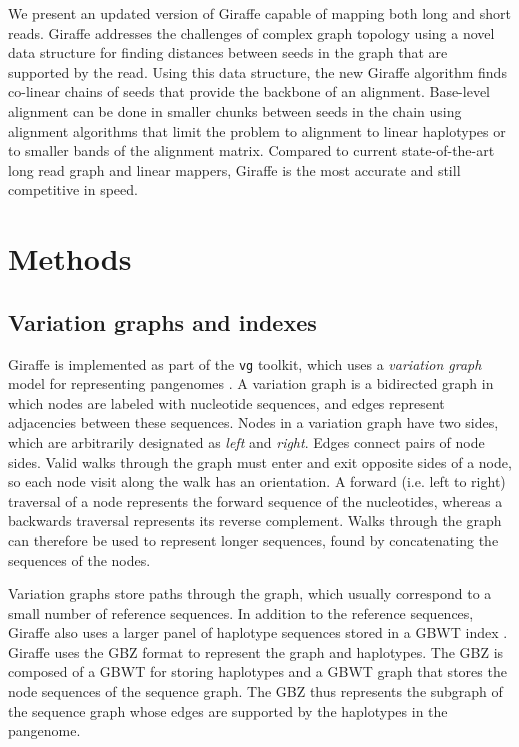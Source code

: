 \documentclass[11pt]{ucscthesis}
\begin{document}
We present an updated version of Giraffe capable of mapping both long and short reads.
Giraffe addresses the challenges of complex graph topology using a novel data structure for finding distances between seeds in the graph that are supported by the read.
Using this data structure, the new Giraffe algorithm finds co-linear chains of seeds that provide the backbone of an alignment.
Base-level alignment can be done in smaller chunks between seeds in the chain using alignment algorithms that limit the problem to alignment to linear haplotypes or to smaller bands of the alignment matrix.
Compared to current state-of-the-art long read graph and linear mappers, Giraffe is the most accurate and still competitive in speed.

\section{Methods}

\subsection{Variation graphs and indexes}

Giraffe is implemented as part of the \texttt{vg} toolkit, which uses a \emph{variation graph} model for representing pangenomes \cite{garrison_vg_2018}.
A variation graph is a bidirected graph in which nodes are labeled with nucleotide sequences, and edges represent adjacencies between these sequences.
Nodes in a variation graph have two sides, which are arbitrarily designated as \emph{left} and \emph{right}.
Edges connect pairs of node sides.
Valid walks through the graph must enter and exit opposite sides of a node, so each node visit along the walk has an orientation.
A forward (i.e. left to right) traversal of a node represents the forward sequence of the nucleotides, whereas a backwards traversal represents its reverse complement.
Walks through the graph can therefore be used to represent longer sequences, found by concatenating the sequences of the nodes.

Variation graphs store paths through the graph, which usually correspond to a small number of reference sequences.
In addition to the reference sequences, Giraffe also uses a larger panel of haplotype sequences stored in a GBWT index \cite{siren_indexes_2020}.
Giraffe uses the GBZ \citep{siren_gbz_2022} format to represent the graph and haplotypes.
The GBZ is composed of a GBWT for storing haplotypes and a GBWT graph that stores the node sequences of the sequence graph. 
The GBZ thus represents the subgraph of the sequence graph whose edges are supported by the haplotypes in the pangenome.
\end{document}
